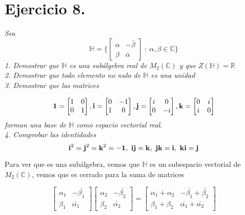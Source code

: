 \section{Ejercicio 8.} \emph{Sea}
\[
  \mathbb{H} = \Big\{ \begin{bmatrix}
    \alpha       &  -\bar{\beta} \\
    \beta       &  \bar{\alpha}
\end{bmatrix} \ : \ \alpha , \beta \in \mathbb{C} \Big\}
\]
\emph{1. Demostrar que \(\mathbb{H}\) es una subálgebra real de
  \(M_2(\mathbb{C})\) y que \(Z(\mathbb{H}) = \mathbb{R}\)}\\
\emph{2. Demostrar que todo elemento no nulo de \(\mathbb{H}\) es una unidad}\\
\emph{3. Demostrar que las matrices}

\[
  \text{\textbf{1}}  = \begin{bmatrix}
    1  &  0 \\
    0  &  1
\end{bmatrix},   \text{\textbf{i}} = \begin{bmatrix}
    0  &  -1 \\
    1  &  0
\end{bmatrix},  \text{\textbf{j}}  = \begin{bmatrix}
    i  &  0 \\
    0  &  -i
\end{bmatrix},   \text{\textbf{k}}  = \begin{bmatrix}
    0  &  i \\
    i  &  0
\end{bmatrix}
\]
\emph{forman una base de \(\mathbb{H}\) como espacio vectorial real.}\\
\emph{4. Comprobar las identidades}
\[
  \text{\textbf{i}} ^2 = \text{\textbf{j}} ^2 = \text{\textbf{k}} ^2 = -\text{\textbf{1}} , \
  \text{\textbf{i}} \text{\textbf{j}}  = \text{\textbf{k}} , \ \text{\textbf{j}} \text{\textbf{k}}  = \text{\textbf{i}} , \ \text{\textbf{k}} \text{\textbf{i}}  = \text{\textbf{j}}
\]

Para ver que es una subálgebra, vemos que \(\mathbb{H}\) es un subespacio
vectorial de \(M_2(\mathbb{C})\), vemos que es cerrado para la suma de matrices

\[
  \begin{bmatrix}
    \alpha_1       &  -\bar{\beta_1} \\
    \beta_1       &  \bar{\alpha_1}
\end{bmatrix} \begin{bmatrix}
    \alpha_2       &  -\bar{\beta_2} \\
    \beta_2       &  \bar{\alpha_2}
\end{bmatrix} = \begin{bmatrix}
    \alpha_1 + \alpha_2 & -\bar{\beta_1} + \bar{\beta_2} \\
    \beta_1 + \beta_2 & \bar{\alpha_1} +\bar{\alpha_2}
\end{bmatrix}
\]

